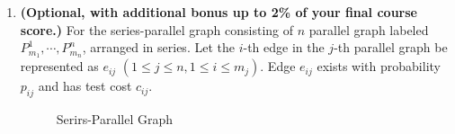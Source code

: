 \documentclass{oxmathproblems}
\begin{document}
\begin{enumerate}
\item  \textbf{(Optional, with additional bonus up to 2\% of your final course score.)} For the series-parallel graph consisting of $n$ parallel graph labeled $P^1_{m_1}, \cdots, P^n_{m_n}$, arranged in series. Let the $i$-th edge in the $j$-th parallel graph be represented as $e_{ij}$ $(1\leq j \leq n, 1\leq i\leq m_j)$. Edge $e_{ij}$ exists with probability $p_{ij}$ and has test cost $c_{ij}$. 
\begin{figure}[htbp]
\caption{Serirs-Parallel Graph}
\end{figure}
\end{enumerate}
\end{document}
